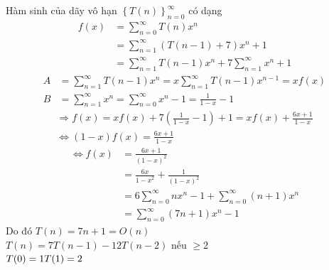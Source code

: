 \documentclass[12pt, a4paper, fleqn]{article}
\begin{document}
Hàm sinh của dãy vô hạn $\left\{T(n)\right\}_{n = 0}^ {\infty}$ có dạng
\setlength{\abovedisplayskip}{3pt}%
\setlength{\belowdisplayskip}{3pt}%
\begin{align*}
f(x) &= \sum_{n = 0} ^ {\infty}T(n)x^ n\\
	 &= \sum_{n = 1} ^ {\infty}(T(n - 1) + 7)x^ n + 1\\
	 &= \sum_{n = 1} ^ {\infty}T(n - 1)x^ n + 7\sum_{n = 1} ^ {\infty}x^ n + 1
\end{align*}
\setlength{\abovedisplayskip}{3pt}%
\setlength{\belowdisplayskip}{3pt}%
\begin{align*}
A &= \sum_{n = 1} ^ {\infty}T(n - 1)x^ n = x\sum_{n = 1} ^ {\infty}T(n - 1)x^ {n - 1} = xf(x)\\
B &= \sum_{n = 1} ^ {\infty}x^ n = \sum_{n = 0} ^ {\infty}x^ n - 1 = \frac{1}{1 - x} -1
\end{align*}
\setlength{\abovedisplayskip}{3pt}%
\setlength{\belowdisplayskip}{3pt}%
\begin{align*}
&\Rightarrow f(x) = xf(x) + 7\left(\frac{1}{1 - x}-1\right) + 1 = xf(x) + \frac{6x + 1}{1 - x} &\\
&\Leftrightarrow(1 - x)f(x) = \frac{6x + 1}{1 - x}
\end{align*}
\setlength{\abovedisplayskip}{3pt}%
\setlength{\belowdisplayskip}{3pt}%
\begin{align*}
\Leftrightarrow f(x) &= \frac{6x + 1}{(1 - x) ^ 2}\\
					 &= \frac{6x}{{1 - x} ^ 2}+\frac{1}{(1 - x) ^ 2}\\
					 &= 6\sum_{n = 0} ^ {\infty}nx^ n - 1 + \sum_{n = 0} ^ {\infty}(n + 1)x^ n\\
					 &= \sum_{n = 0} ^ {\infty}(7n + 1)x^ n - 1
\end{align*}
Do đó $T(n) = 7n + 1 = O(n)$\\
	
$T(n) = 7T(n - 1) - 12T(n - 2)$ nếu $ \geq 2$\\
$T(0) = 1\\
T(1) = 2$
	
\end{document}

